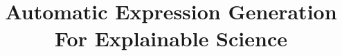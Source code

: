 \documentclass[acmsmall,screen]{acmart}
\begin{document}
\title[Automatic Expression Generation For Explainable Science]{Automatic Expression Generation For Explainable Science}
\maketitle





% 



\end{document}
